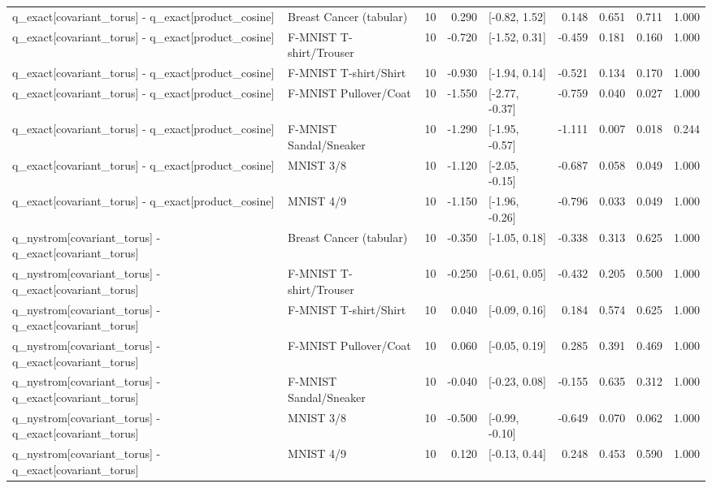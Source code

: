 \begin{table}
\begin{tabular}{llrrlrrrr}
q\_exact[covariant\_torus] - q\_exact[product\_cosine] & Breast Cancer (tabular) & 10 & 0.290 & [-0.82, 1.52] & 0.148 & 0.651 & 0.711 & 1.000 \\
q\_exact[covariant\_torus] - q\_exact[product\_cosine] & F-MNIST T-shirt/Trouser & 10 & -0.720 & [-1.52, 0.31] & -0.459 & 0.181 & 0.160 & 1.000 \\
q\_exact[covariant\_torus] - q\_exact[product\_cosine] & F-MNIST T-shirt/Shirt & 10 & -0.930 & [-1.94, 0.14] & -0.521 & 0.134 & 0.170 & 1.000 \\
q\_exact[covariant\_torus] - q\_exact[product\_cosine] & F-MNIST Pullover/Coat & 10 & -1.550 & [-2.77, -0.37] & -0.759 & 0.040 & 0.027 & 1.000 \\
q\_exact[covariant\_torus] - q\_exact[product\_cosine] & F-MNIST Sandal/Sneaker & 10 & -1.290 & [-1.95, -0.57] & -1.111 & 0.007 & 0.018 & 0.244 \\
q\_exact[covariant\_torus] - q\_exact[product\_cosine] & MNIST 3/8 & 10 & -1.120 & [-2.05, -0.15] & -0.687 & 0.058 & 0.049 & 1.000 \\
q\_exact[covariant\_torus] - q\_exact[product\_cosine] & MNIST 4/9 & 10 & -1.150 & [-1.96, -0.26] & -0.796 & 0.033 & 0.049 & 1.000 \\
q\_nystrom[covariant\_torus] - q\_exact[covariant\_torus] & Breast Cancer (tabular) & 10 & -0.350 & [-1.05, 0.18] & -0.338 & 0.313 & 0.625 & 1.000 \\
q\_nystrom[covariant\_torus] - q\_exact[covariant\_torus] & F-MNIST T-shirt/Trouser & 10 & -0.250 & [-0.61, 0.05] & -0.432 & 0.205 & 0.500 & 1.000 \\
q\_nystrom[covariant\_torus] - q\_exact[covariant\_torus] & F-MNIST T-shirt/Shirt & 10 & 0.040 & [-0.09, 0.16] & 0.184 & 0.574 & 0.625 & 1.000 \\
q\_nystrom[covariant\_torus] - q\_exact[covariant\_torus] & F-MNIST Pullover/Coat & 10 & 0.060 & [-0.05, 0.19] & 0.285 & 0.391 & 0.469 & 1.000 \\
q\_nystrom[covariant\_torus] - q\_exact[covariant\_torus] & F-MNIST Sandal/Sneaker & 10 & -0.040 & [-0.23, 0.08] & -0.155 & 0.635 & 0.312 & 1.000 \\
q\_nystrom[covariant\_torus] - q\_exact[covariant\_torus] & MNIST 3/8 & 10 & -0.500 & [-0.99, -0.10] & -0.649 & 0.070 & 0.062 & 1.000 \\
q\_nystrom[covariant\_torus] - q\_exact[covariant\_torus] & MNIST 4/9 & 10 & 0.120 & [-0.13, 0.44] & 0.248 & 0.453 & 0.590 & 1.000 \\
\bottomrule
\end{tabular}
\end{table}
